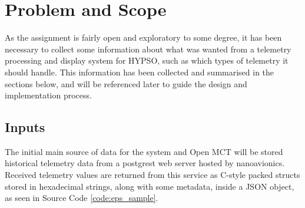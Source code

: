 \begin{comment}
Assignment has no clear scope or specification, exploratory to some degree since much of it is unknown - set own requirements

Design Open MCT implementation; get telemetry from different sources, parse and adapt for display

Minimize overhead with adding new data sources - should require work in a small amount of new code; backend and frontend needs to be flexible

Prioritize loading and working with current known data sources (NA telemetry)
Requirements
 - Should be able to load current NA telemetry from their DB
 - Needs to be modular and maintainable
 - Should be able to provide x amount of data to x users in x time
 
What do we have to work with - how do we get telemetry, what form does it come in?
 - C struct stored in hex string

What restrictions do we have on how/when/where we can get the telemetry?
 - Restricted by IP, cannot get telemetry from anywhere easily - need to go through NA contact person to get new machines added

What does Open MCT need?
 - Object provider
 - Telemetry provider
 - Telemetry metadata provider
\end{comment}

\section{Problem and Scope}
As the assignment is fairly open and exploratory to some degree, it has been necessary to collect some information about what was wanted from a telemetry processing and display system for HYPSO, such as which types of telemetry it should handle. This information has been collected and summarised in the sections below, and will be referenced later to guide the design and implementation process.

\subsection{Inputs}
The initial main source of data for the system and Open MCT will be stored historical telemetry data from a \Gls{postgrest} web server hosted by \Gls{nanoavionics}. Received telemetry values are returned from this service as C-style packed \glspl{struct} stored in hexadecimal strings, along with some metadata, inside a JSON object, as seen in Source Code \ref{code:eps_sample}. \cite{na_postgrest}

